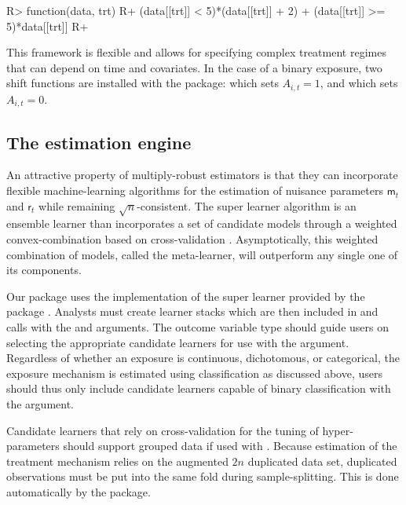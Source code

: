 \documentclass[]{jss}
\newcommand{\Q}{\mathsf{m}}
\renewcommand{\r}{\mathsf{r}}
\begin{document}
\begin{CodeChunk}

\begin{CodeInput}
R> function(data, trt) {
R+  (data[[trt]] < 5)*(data[[trt]] + 2) + (data[[trt]] >= 5)*data[[trt]]
R+ }
\end{CodeInput}

\end{CodeChunk}

This framework is flexible and allows for specifying complex treatment
regimes that can depend on time and covariates. In the case of a
binary exposure, two shift functions are installed with
the package:  which sets \(A_{i, t} = 1\), and
 which sets \(A_{i, t} = 0\).

\hypertarget{the-estimation-engine}{%
\subsection{The estimation engine}\label{the-estimation-engine}}

An attractive property of multiply-robust estimators is that they can
incorporate flexible machine-learning algorithms for the estimation of
nuisance parameters $\Q_t$ and $\r_t$ while remaining
\(\sqrt{n}\)-consistent. The super learner algorithm is an ensemble
learner than incorporates a set of candidate models through a weighted
convex-combination based on cross-validation
\citep{laanSuperLearner2007}. Asymptotically, this weighted
combination of models, called the meta-learner, will outperform any
single one of its components.

Our package uses the implementation of the super learner provided by
the  package \citep{coyleSl3}. Analysts must create 
learner stacks which are then included in  and
 calls with the  and
 arguments. The outcome variable type should guide
users on selecting the appropriate candidate learners for use with the
 argument. Regardless of whether an exposure is
continuous, dichotomous, or categorical, the exposure mechanism is
estimated using classification as discussed above, users should thus
only include candidate learners capable of binary classification with
the  argument.

Candidate learners that rely on cross-validation
for the tuning of hyper-parameters should support grouped data if used with . Because
estimation of the treatment mechanism relies on the augmented \(2n\) duplicated
data set, duplicated observations must be put into the same fold
during sample-splitting. This is done automatically by the package.
\end{document}
